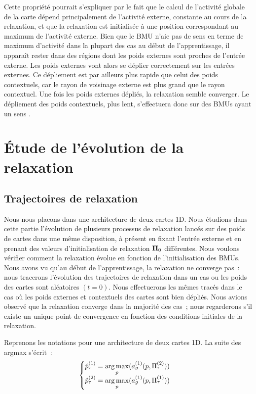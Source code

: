 \documentclass[../main]{subfiles}
\begin{document}
Cette propriété pourrait s'expliquer par le fait que le calcul de l'activité globale de la carte dépend principalement de l'activité externe, constante au cours de la relaxation, et que la relaxation est initialisée à une position correspondant au maximum de l'activité externe.
Bien que le BMU n'aie pas de \og sens \fg{} en terme de maximum d'activité dans la plupart des cas au début de l'apprentissage, il apparaît rester dans des régions dont les poids externes sont proches de l'entrée externe.
Les poids externes vont alors se déplier correctement sur les entrées externes. Ce dépliement est par ailleurs plus rapide que celui des poids contextuels, car le rayon de voisinage externe est plus grand que le rayon contextuel.
Une fois les poids externes dépliés, la relaxation semble converger. Le dépliement des poids contextuels, plus lent, s'effectuera donc sur des BMUs ayant un \og sens \fg{}.

\section{\'Etude de l'évolution de la relaxation}

\subsection{Trajectoires de relaxation\label{sec:pf}}

Nous nous placons dans une architecture de deux cartes 1D.
Nous étudions dans cette partie l'évolution de plusieurs processus de relaxation lancés sur des poids de cartes dans une même disposition, à présent en fixant l'entrée externe et en prenant des valeurs d'initialisation de relaxation $\mathbf{\Pi}_0$ différentes.
Nous voulons vérifier comment la relaxation évolue en fonction de l'initialisation des BMUs.
Nous avons vu qu'au début de l'apprentissage, la relaxation ne converge pas~: nous tracerons l'évolution des trajectoires de relaxation dans un cas ou les poids des cartes sont aléatoires $(t=0)$.
Nous effectuerons les mêmes tracés dans le cas où les poids externes et contextuels des cartes sont bien dépliés. Nous avions observé que la relaxation converge dans la majorité des cas~; nous regarderons s'il existe un unique point de convergence en fonction des conditions initiales de la relaxation.

Reprenons les notations pour une architecture de deux cartes 1D. La suite des argmax s'écrit~:
\begin{equation*}
	\begin{cases}
	\hat{p}^{({1})}_\tau = \operatorname*{arg\,max}\limits_p(a_g^{({1})}(p, \Pi^{({2})}_\tau))\\
	\hat{p}^{({2})}_\tau = \operatorname*{arg\,max}\limits_p(a_g^{({1})}(p, \Pi^{({1})}_\tau)) \\
	\end{cases}
	\end{equation*}
\end{document}
